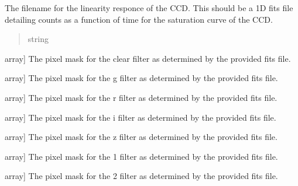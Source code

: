 \documentclass[letterpaper,11pt,english]{sphinxmanual}
\begin{document}
\begin{savenotes}
\begin{fulllineitems}
\begin{savenotes}
\begin{fulllineitems}
\end{fulllineitems}\end{savenotes}


\begin{savenotes}\begin{fulllineitems}
\label{\detokenize{code/opihiexarata.opihi.preprocess:opihiexarata.opihi.preprocess.OpihiPreprocessSolution._linearity_fits_filename}}
\pysigstartsignatures
{}
\pysigstopsignatures
\sphinxAtStartPar
The filename for the linearity responce of the CCD. This should be a
1D fits file detailing counts as a function of time for the saturation
curve of the CCD.
\begin{quote}\begin{description}
\sphinxAtStartPar
string

\end{description}\end{quote}

\end{fulllineitems}\end{savenotes}

\begin{description}
\sphinxlineitem{mask\_c}{[}array{]}
\sphinxAtStartPar
The pixel mask for the clear filter as determined by the provided
fits file.

\sphinxlineitem{mask\_g}{[}array{]}
\sphinxAtStartPar
The pixel mask for the g filter as determined by the provided
fits file.

\sphinxlineitem{mask\_r}{[}array{]}
\sphinxAtStartPar
The pixel mask for the r filter as determined by the provided
fits file.

\sphinxlineitem{mask\_i}{[}array{]}
\sphinxAtStartPar
The pixel mask for the i filter as determined by the provided
fits file.

\sphinxlineitem{mask\_z}{[}array{]}
\sphinxAtStartPar
The pixel mask for the z filter as determined by the provided
fits file.

\sphinxlineitem{mask\_1}{[}array{]}
\sphinxAtStartPar
The pixel mask for the 1 filter as determined by the provided
fits file.

\sphinxlineitem{mask\_2}{[}array{]}
\sphinxAtStartPar
The pixel mask for the 2 filter as determined by the provided
fits file.


\end{description}
\end{fulllineitems}
\end{savenotes}
\end{document}
